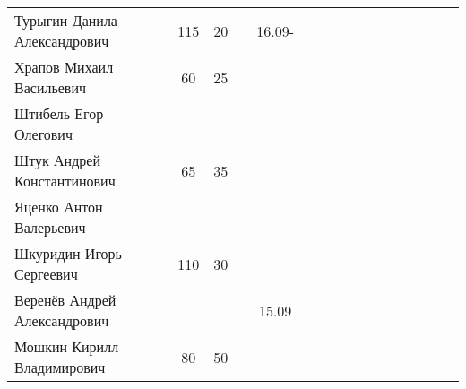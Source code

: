 \documentclass[a4paper,11pt]{article}
\begin{document}
\begin{tabular}{l|ccccccccccccccc}
Турыгин Данила Александрович	&115&20&&16.09- &\\
Храпов Михаил Васильевич	&60&25&&       &\\	
\midrule                                    
Штибель Егор Олегович		&&&&       &\\
Штук Андрей Константинович	&65&35&&       &\\	
Яценко Антон Валерьевич		&&&&       &\\
Шкуридин Игорь Сергеевич	&110&30&&       &\\	
Веренёв Андрей Александрович	&&&&15.09  &\\
Мошкин Кирилл Владимирович	&80&50&&       &\\	
\bottomrule
\end{tabular}
\end{document}
